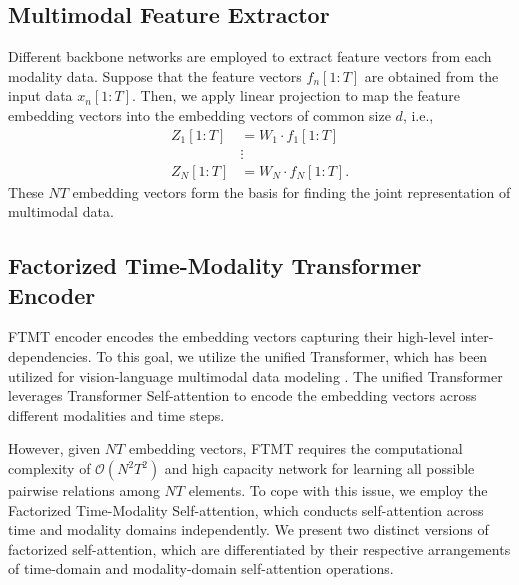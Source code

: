 \subsection{Multimodal Feature Extractor}
Different backbone networks are employed to extract feature vectors from each modality data. Suppose that the feature vectors $f_{n}[1:T]$ are obtained from the input data $x_{n}[1:T]$.
Then, we apply linear projection to map the feature embedding vectors into the embedding vectors of common size $d$, i.e.,
\begin{equation}
    \begin{split}
     Z_{1}[1:T] &= W_{1}\cdot f_{1}[1:T] \\
   & \vdots \\
    Z_{N}[1:T] &= W_{N}\cdot f_{N}[1:T].
    \end{split}
  \end{equation}
These $NT$ embedding vectors form the basis for finding the joint representation of multimodal data.

\subsection{Factorized Time-Modality Transformer Encoder}
FTMT encoder encodes the embedding vectors capturing their high-level inter-dependencies. 
To this goal, we utilize the unified Transformer, which has been utilized for vision-language multimodal data modeling  \cite{zhou2020unified}.  The unified Transformer leverages Transformer Self-attention to encode the embedding vectors across different modalities and time steps.

However, given $NT$ embedding vectors, FTMT requires the computational complexity of $\mathcal{O}(N^2 T^2)$ and high capacity network for learning all possible pairwise relations among $NT$ elements. To cope with this issue, we employ the Factorized Time-Modality Self-attention, which conducts self-attention across time and modality domains  independently. We present two distinct versions of factorized self-attention, which are differentiated by their respective arrangements of time-domain and modality-domain self-attention operations.


